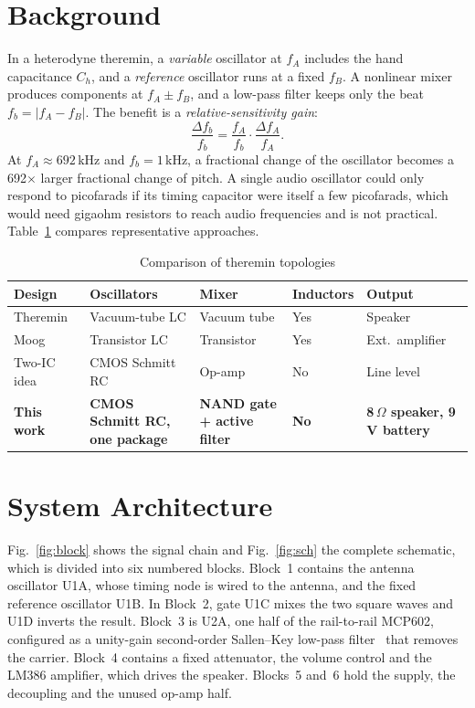 \documentclass[conference]{IEEEtran}
\begin{document}
\section{Background}\label{sec:bg}
In a heterodyne theremin, a \emph{variable} oscillator at $f_A$ includes the hand capacitance $C_h$, and a \emph{reference} oscillator runs at a fixed $f_B$. A nonlinear mixer produces components at $f_A\pm f_B$, and a low-pass filter keeps only the beat $f_b=|f_A-f_B|$. The benefit is a \emph{relative-sensitivity gain}:
\begin{equation}
\frac{\Delta f_b}{f_b}=\frac{f_A}{f_b}\cdot\frac{\Delta f_A}{f_A}.
\label{eq:gain}
\end{equation}
At $f_A\approx692$\,kHz and $f_b=1$\,kHz, a fractional change of the oscillator becomes a 692$\times$ larger fractional change of pitch. A single audio oscillator could only respond to picofarads if its timing capacitor were itself a few picofarads, which would need gigaohm resistors to reach audio frequencies and is not practical. Table~\ref{tab:compare} compares representative approaches.

\begin{table}[!t]
\centering
\caption{Comparison of theremin topologies}
\label{tab:compare}
\setlength{\tabcolsep}{3pt}
\renewcommand{\arraystretch}{1.1}
\footnotesize
\begin{tabular}{@{}p{1.65cm}p{1.6cm}p{1.45cm}p{0.75cm}p{1.3cm}@{}}
\toprule
Design & Oscillators & Mixer & Induc\-tors & Output \\
\midrule
Theremin~\cite{theremin1928} & Vacuum-tube LC & Vacuum tube & Yes & Speaker \\
Moog~\cite{moog1961} & Transistor LC & Transistor & Yes & Ext.\ amplifier \\
Two-IC idea~\cite{greatscott} & CMOS Schmitt RC & Op-amp & No & Line level \\
\textbf{This work} & \textbf{CMOS Schmitt RC, one package} & \textbf{NAND gate + active filter} & \textbf{No} & \textbf{8\,$\Omega$ speaker, 9\,V battery} \\
\bottomrule
\end{tabular}
\end{table}

\section{System Architecture}\label{sec:arch}
Fig.~\ref{fig:block} shows the signal chain and Fig.~\ref{fig:sch} the complete schematic, which is divided into six numbered blocks. Block~1 contains the antenna oscillator U1A, whose timing node is wired to the antenna, and the fixed reference oscillator U1B. In Block~2, gate U1C mixes the two square waves and U1D inverts the result. Block~3 is U2A, one half of the rail-to-rail MCP602, configured as a unity-gain second-order Sallen--Key low-pass filter~\cite{sallenkey1955,franco2015} that removes the carrier. Block~4 contains a fixed attenuator, the volume control and the LM386 amplifier, which drives the speaker. Blocks~5 and~6 hold the supply, the decoupling and the unused op-amp half.
\end{document}
